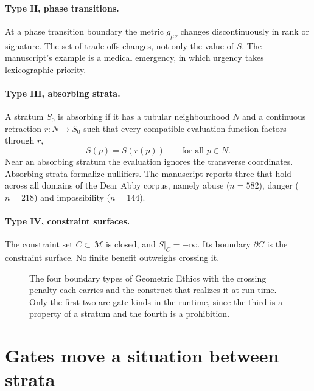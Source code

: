 \paragraph{Type II, phase transitions.} At a phase transition boundary the metric $g_{\mu\nu}$
changes discontinuously in rank or signature. The set of trade-offs changes, not only the value
of $S$. The manuscript's example is a medical emergency, in which urgency takes lexicographic
priority.

\paragraph{Type III, absorbing strata.} A stratum $S_0$ is absorbing if it has a tubular
neighbourhood $N$ and a continuous retraction $r\colon N\to S_0$ such that every compatible
evaluation function factors through $r$,
\begin{equation}
S(p) = S(r(p)) \qquad \text{for all } p\in N .
\label{eq:ge-absorbing}
\end{equation}
Near an absorbing stratum the evaluation ignores the transverse coordinates. Absorbing strata
formalize nullifiers. The manuscript reports three that hold across all domains of the Dear Abby
corpus, namely abuse ($n=582$), danger ($n=218$) and impossibility ($n=144$).

\paragraph{Type IV, constraint surfaces.} The constraint set $C\subset\mathcal{M}$ is closed, and
$S|_C = -\infty$. Its boundary $\partial C$ is the constraint surface. No finite benefit outweighs
crossing it.

\begin{figure}[t]
\centering

\caption{The four boundary types of Geometric Ethics with the crossing penalty each carries and
the construct that realizes it at run time. Only the first two are gate kinds in the runtime,
since the third is a property of a stratum and the fourth is a prohibition.}
\label{fig:ge-boundaries}
\end{figure}

\section{Gates move a situation between strata}\label{sec:ge-gates}

